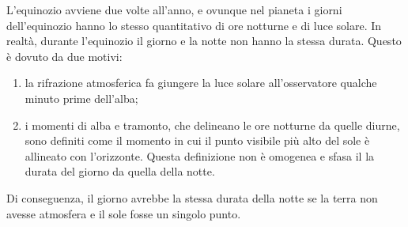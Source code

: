 \documentclass[a4paper]{article}
\begin{document}
L'equinozio avviene due volte all'anno, e ovunque nel pianeta i giorni dell'equinozio hanno lo stesso quantitativo di ore notturne e di luce solare.
In realtà, durante l'equinozio il giorno e la notte non hanno la stessa durata.
Questo è dovuto da due motivi:
\begin{enumerate}
    \item la rifrazione atmosferica fa giungere la luce solare all'osservatore qualche minuto prime dell'alba;
    \item i momenti di alba e tramonto, che delineano le ore notturne da quelle diurne, sono definiti come il momento in cui il punto visibile più alto del sole è allineato con l'orizzonte. Questa definizione non è omogenea e sfasa il la durata del giorno da quella della notte.
\end{enumerate}
Di conseguenza, il giorno avrebbe la stessa durata della notte se la terra non avesse atmosfera e il sole fosse un singolo punto.

\end{document}
